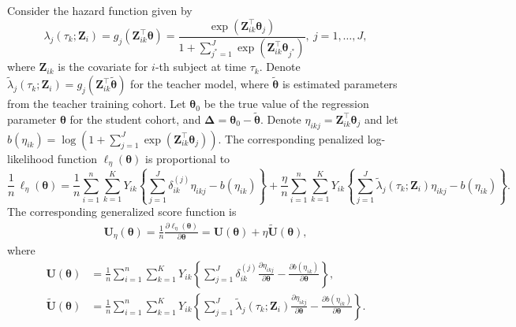 \documentclass{article}
\theoremstyle{plain}
\theoremstyle{definition}
\theoremstyle{remark}
\begin{document}
Consider the hazard function given by
\begin{equation*}
    \lambda_j(\tau_k;\boldsymbol{Z}_{i}) =g_j(\boldsymbol{Z}_{ik}^\top\boldsymbol{\theta})= \frac{\exp(\boldsymbol{Z}_{ik}^\top\boldsymbol{\theta}_j)}{1+\sum_{j^*=1}^J\exp(\boldsymbol{Z}_{ik}^\top\boldsymbol{\theta}_{j^*})},~j=1, \ldots, J,
\end{equation*}
 where
$\boldsymbol{Z}_{ik}$ is the covariate for $i$-th subject at time $\tau_k$. Denote $\tilde{\lambda}_j(\tau_k;\boldsymbol{Z}_{i}) = g_j(\boldsymbol{Z}^\top_{ik} \tilde{\boldsymbol{\theta}})$ for the teacher model, where
$\tilde{\boldsymbol{\theta}}$ is estimated parameters from the teacher training cohort. 
Let $\boldsymbol{\theta}_0$ be the true value of the regression parameter $\boldsymbol{\theta}$ for the student cohort, and $\boldsymbol{\Delta}=\boldsymbol{\theta}_0-\tilde{\boldsymbol{\theta}}$.
Denote $\eta_{ikj}=\boldsymbol{Z}^\top_{ik} \boldsymbol{\theta}_j$ and let $b(\eta_{ik})=\log\!\left(
        1 + \sum_{j=1}^J
        \exp(\boldsymbol{Z}^\top_{ik} \boldsymbol{\theta}_j)
      \right)$.
The corresponding penalized log-likelihood  function $\ell_{\eta}(\boldsymbol{\theta})$ is proportional to
\begin{equation*}
\frac{1}{n}\,\ell_{\eta}(\boldsymbol{\theta})
= \frac{1}{n} \sum_{i=1}^n\sum_{k=1}^{K} Y_{ik} \left\{ 
\sum_{j=1}^J
    \delta_{ik}^{(j)}\eta_{ikj} - b(\eta_{ik}) \right\}
+ \frac{\eta}{n} \sum_{i=1}^n\sum_{k=1}^{K} Y_{ik}\left\{\sum_{j=1}^J\tilde\lambda_j(\tau_k;\boldsymbol{Z}_{i})\eta_{ikj} - b(\eta_{ik}) \right\}.
\end{equation*}
The corresponding generalized score function is
\begin{eqnarray*}
\boldsymbol{U}_\eta(\boldsymbol{\theta})
=\frac{1}{n}\frac{\partial \ell_{\eta}(\boldsymbol{\theta})}{\partial \boldsymbol{\theta}}
=\boldsymbol{U}(\boldsymbol{\theta})+\eta \widetilde{\boldsymbol{U}}(\boldsymbol{\theta}),
\end{eqnarray*}
where 
\begin{equation*}
\begin{aligned}
\boldsymbol{U}(\boldsymbol{\theta})
&= \frac{1}{n} \sum_{i=1}^n\sum_{k=1}^{K}  Y_{ik}\left\{ 
\sum_{j=1}^J\delta_{ik}^{(j)} \frac{\partial \eta_{ikj}}{\partial \boldsymbol{\theta}}
- \frac{\partial b(\eta_{ik})}{\partial \boldsymbol{\theta}}\right\}, \\
\widetilde{\boldsymbol{U}}(\boldsymbol{\theta})
&= \frac{1}{n} \sum_{i=1}^n\sum_{k=1}^{K} Y_{ik}\left\{ 
\sum_{j=1}^J\tilde\lambda_j(\tau_k;\boldsymbol{Z}_{i}) \frac{\partial \eta_{ikj}}{\partial \boldsymbol{\theta}}
- \frac{\partial b(\eta_{ik})}{\partial \boldsymbol{\theta}}\right\}.
\end{aligned}
\end{equation*}
\end{document}
